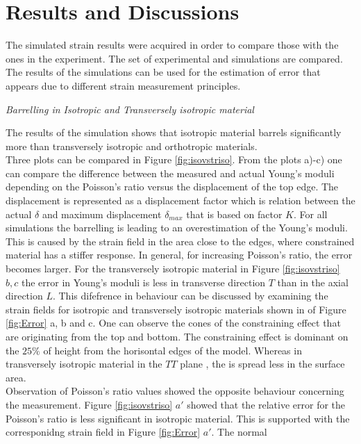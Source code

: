 \documentclass[review]{elsarticle}
\begin{document}
\section{Results and Discussions}
The simulated strain results were acquired in order to compare those with the
ones in the experiment. The set of experimental and simulations are
compared. The results of the simulations can be used for the
estimation of error that appears due to different strain measurement principles.

\begin{description}
\item{\textit{ Barrelling in Isotropic and Transversely isotropic material}}
\end{description}
The results of the simulation shows that isotropic material barrels
significantly more than transversely isotropic and orthotropic materials. \\	
Three plots can be compared in Figure \ref{fig:isovstriso}. 
From the plots a)-c) one can compare the difference between the measured and actual 
Young's moduli depending on the Poisson's ratio versus the
displacement of the top edge. The displacement is represented as a displacement
factor which is relation between the actual $\delta$ and maximum
displacement $\delta_{max}$ that is based on factor $K$. For all simulations the
barrelling is leading to an overestimation of the Young's moduli. This is caused by the strain field in the area close to the edges, where constrained material has a stiffer response.
In general, for increasing Poisson's ratio, the error becomes larger. 
For the transversely isotropic material in Figure
\ref{fig:isovstriso} $b,c$ the error in Young's moduli is less in
transverse direction $T$ than in the axial direction $L$.
This difefrence in behaviour can be discussed by examining the strain fields for isotropic and 
transversely isotropic materials shown in of Figure
\ref{fig:Error} a, b and c. One can
observe the cones of the constraining effect that are originating from the top
and bottom. The constraining effect is dominant on the $25\%$ of height
from the horisontal edges of the model. Whereas in transversely isotropic
material in the $TT$ plane , the is spread less in the surface area.\\
Observation of Poisson's ratio values showed the opposite behaviour concerning
the measurement.
Figure \ref{fig:isovstriso} $a'$ showed that the relative error for the
Poisson's ratio is less significant in isotropic material. This is supported
with the corresponidng strain field in Figure \ref{fig:Error} $a'$. The normal
\end{document}
